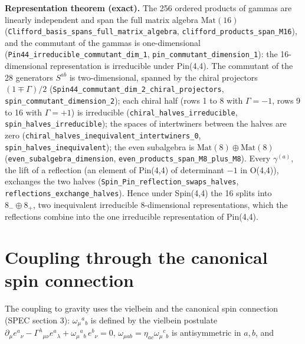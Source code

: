 \documentclass[11pt]{article}
\begin{document}
\textbf{Representation theorem (exact).} The 256 ordered products of gammas are linearly independent and span the full matrix algebra $\mathrm{Mat}(16)$ (\texttt{Clifford\allowbreak{}\_basis\_s\allowbreak{}pans\_ful\allowbreak{}l\_matrix\allowbreak{}\_algebra}, \texttt{clifford\allowbreak{}\_product\allowbreak{}s\_span\_M\allowbreak{}16}), and the commutant of the gammas is one-dimensional (\texttt{Pin44\_ir\allowbreak{}reducibl\allowbreak{}e\_commut\allowbreak{}ant\_dim\_\allowbreak{}1}, \texttt{pin\_comm\allowbreak{}utant\_di\allowbreak{}mension\_\allowbreak{}1}): the 16-dimensional representation is irreducible under Pin(4,4). The commutant of the 28 generators $S^{ab}$ is two-dimensional, spanned by the chiral projectors $(1 \mp \Gamma)/2$ (\texttt{Spin44\_c\allowbreak{}ommutant\allowbreak{}\_dim\_2\_c\allowbreak{}hiral\_pr\allowbreak{}ojectors}, \texttt{spin\_com\allowbreak{}mutant\_d\allowbreak{}imension\allowbreak{}\_2}); each chiral half (rows 1 to 8 with $\Gamma = -1$, rows 9 to 16 with $\Gamma = +1$) is irreducible (\texttt{chiral\_h\allowbreak{}alves\_ir\allowbreak{}reducibl\allowbreak{}e}, \texttt{spin\_hal\allowbreak{}ves\_irre\allowbreak{}ducible}); the spaces of intertwiners between the halves are zero (\texttt{chiral\_h\allowbreak{}alves\_in\allowbreak{}equivale\allowbreak{}nt\_inter\allowbreak{}twiners\_\allowbreak{}0}, \texttt{spin\_hal\allowbreak{}ves\_ineq\allowbreak{}uivalent}); the even subalgebra is $\mathrm{Mat}(8) \oplus \mathrm{Mat}(8)$ (\texttt{even\_sub\allowbreak{}algebra\_\allowbreak{}dimensio\allowbreak{}n}, \texttt{even\_pro\allowbreak{}ducts\_sp\allowbreak{}an\_M8\_pl\allowbreak{}us\_M8}). Every $\gamma^{(a)}$, the lift of a reflection (an element of Pin(4,4) of determinant $-1$ in O(4,4)), exchanges the two halves (\texttt{Spin\_Pin\allowbreak{}\_reflect\allowbreak{}ion\_swap\allowbreak{}s\_halves}, \texttt{reflecti\allowbreak{}ons\_exch\allowbreak{}ange\_hal\allowbreak{}ves}). Hence under Spin(4,4) the 16 splits into $8_- \oplus 8_+$, two inequivalent irreducible 8-dimensional representations, which the reflections combine into the one irreducible representation of Pin(4,4).

\section{Coupling through the canonical spin connection}

The coupling to gravity uses the vielbein and the canonical spin connection (SPEC section 3): $\omega_\mu{}^a{}_b$ is defined by the vielbein postulate $\partial_\mu e^a{}_\nu - \Gamma^\lambda{}_{\mu\nu}e^a{}_\lambda + \omega_\mu{}^a{}_b\,e^b{}_\nu = 0$, $\omega_{\mu ab} = \eta_{ac}\omega_\mu{}^c{}_b$ is antisymmetric in $a, b$, and
\end{document}
